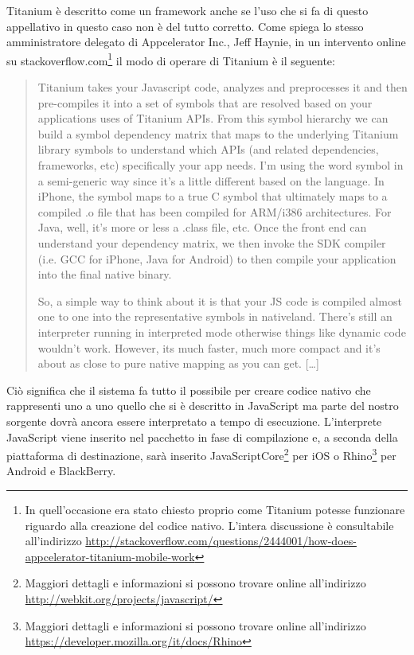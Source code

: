 			Titanium è descritto come un framework \crosscomp{}\citep{Web:peptechlearn.blogspot.it} anche se l'uso che si fa di 
			questo appellativo in questo caso non è del tutto corretto. Come 
			spiega lo stesso amministratore delegato di Appcelerator Inc., Jeff 
			Haynie, in un intervento online su 
			\mbox{stackoverflow.com}\footnote{In quell'occasione era stato 
			chiesto proprio come Titanium potesse funzionare riguardo alla 
			creazione del codice nativo. L'intera discussione è consultabile 
			all'indirizzo 
			\url{http://stackoverflow.com/questions/2444001/how-does-appcelerator-titanium-mobile-work}}
			il modo di operare di Titanium è il seguente:
			\begin{quotation}
				Titanium takes your Javascript code, analyzes and preprocesses 
				it and then pre-compiles it into a set of symbols that are 
				resolved based on your applications uses of Titanium APIs. From 
				this symbol hierarchy we can build a symbol dependency matrix 
				that maps to the underlying Titanium library symbols to 
				understand which APIs (and related dependencies, frameworks, 
				etc) specifically your app needs. I'm using the word symbol in a 
				semi-generic way since it's a little different based on the 
				language. In iPhone, the symbol maps to a true C symbol that 
				ultimately maps to a compiled .o file that has been compiled for 
				ARM/i386 architectures. For Java, well, it's more or less a 
				.class file, etc. Once the front end can understand your 
				dependency matrix, we then invoke the SDK compiler (i.e. GCC for 
				iPhone, Java for Android) to then compile your application into 
				the final native binary.
				
				So, a simple way to think about it is that your JS code is 
				compiled almost one to one into the representative symbols in 
				nativeland. There's still an interpreter running in interpreted 
				mode otherwise things like dynamic code wouldn't work. However, 
				its much faster, much more compact and it's about as close to 
				pure native mapping as you can get. [\ldots]
			\end{quotation}
			Ciò significa che il sistema fa tutto il possibile per creare codice 
			nativo che rappresenti uno a uno quello che si è descritto in 
			JavaScript ma parte del nostro sorgente dovrà ancora essere 
			interpretato a tempo di esecuzione. L'interprete JavaScript viene 
			inserito nel pacchetto in fase di compilazione e, a seconda della 
			piattaforma di destinazione, sarà inserito 
			JavaScriptCore\footnote{Maggiori dettagli e informazioni si possono 
			trovare online all'indirizzo \url{http://webkit.org/projects/javascript/}} 
			per iOS o Rhino\footnote{Maggiori dettagli e informazioni si possono trovare 
			online all'indirizzo \url{https://developer.mozilla.org/it/docs/Rhino}} 
			per Android e BlackBerry\citep{Web:KevinPost}.
			
